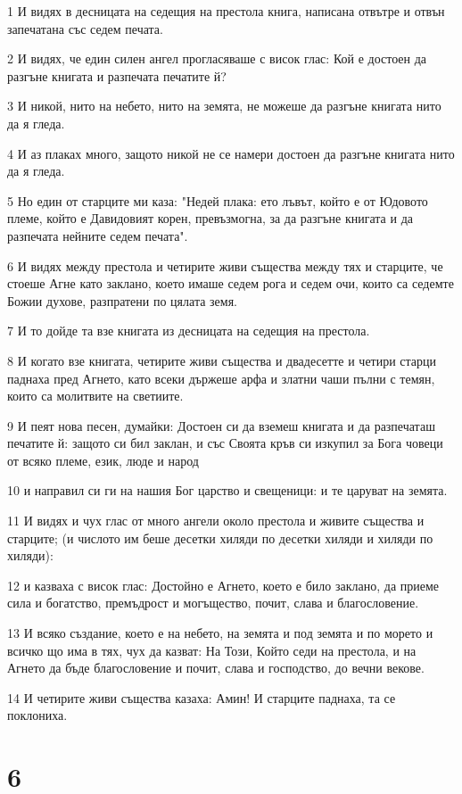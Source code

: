 \par 1 И видях в десницата на седещия на престола книга, написана отвътре и отвън запечатана със седем печата.
\par 2 И видях, че един силен ангел прогласяваше с висок глас: Кой е достоен да разгъне книгата и разпечата печатите й?
\par 3 И никой, нито на небето, нито на земята, не можеше да разгъне книгата нито да я гледа.
\par 4 И аз плаках много, защото никой не се намери достоен да разгъне книгата нито да я гледа.
\par 5 Но един от старците ми каза: "Недей плака: ето лъвът, който е от Юдовото племе, който е Давидовият корен, превъзмогна, за да разгъне книгата и да разпечата нейните седем печата".
\par 6 И видях между престола и четирите живи същества между тях и старците, че стоеше Агне като заклано, което имаше седем рога и седем очи, които са седемте Божии духове, разпратени по цялата земя.
\par 7 И то дойде та взе книгата из десницата на седещия на престола.
\par 8 И когато взе книгата, четирите живи същества и двадесетте и четири старци паднаха пред Агнето, като всеки държеше арфа и златни чаши пълни с темян, които са молитвите на светиите.
\par 9 И пеят нова песен, думайки: Достоен си да вземеш книгата и да разпечаташ печатите й: защото си бил заклан, и със Своята кръв си изкупил за Бога човеци от всяко племе, език, люде и народ
\par 10 и направил си ги на нашия Бог царство и свещеници: и те царуват на земята.
\par 11 И видях и чух глас от много ангели около престола и живите същества и старците; (и числото им беше десетки хиляди по десетки хиляди и хиляди по хиляди):
\par 12 и казваха с висок глас: Достойно е Агнето, което е било заклано, да приеме сила и богатство, премъдрост и могъщество, почит, слава и благословение.
\par 13 И всяко създание, което е на небето, на земята и под земята и по морето и всичко що има в тях, чух да казват: На Този, Който седи на престола, и на Агнето да бъде благословение и почит, слава и господство, до вечни векове.
\par 14 И четирите живи същества казаха: Амин! И старците паднаха, та се поклониха.

\chapter{6}

